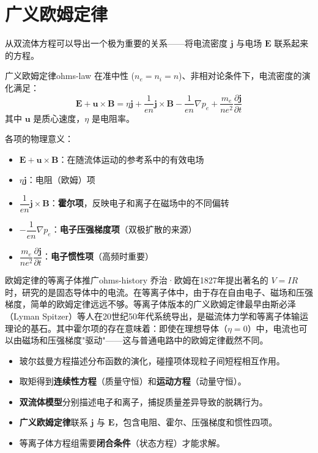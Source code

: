 \documentclass[12pt,a4paper,openany,oneside]{book}
\newcommand{\vect}[1]{\bm{#1}}
\newcommand{\grad}{\nabla}
\newcommand{\difficulty}[1]{\marginnote{\hfill\textcolor{coverMid!80}{\rule[-0.1em]{2pt}{0.9em}}\,\textcolor{coverMid}{\footnotesize\textbf{[#1]}}}}
\begin{document}
\section{广义欧姆定律}\difficulty{提高}

从双流体方程可以导出一个极为重要的关系——将电流密度 $\vect{j}$ 与电场 $\vect{E}$ 联系起来的方程。

\begin{theorem}{广义欧姆定律}{ohms-law}
在准中性 ($n_e = n_i = n$)、非相对论条件下，电流密度的演化满足：
\[
\vect{E} + \vect{u}\times\vect{B} = \eta\vect{j} + \frac{1}{en}\vect{j}\times\vect{B} - \frac{1}{en}\grad p_e + \frac{m_e}{n e^2}\frac{\partial\vect{j}}{\partial t}
\]
其中 $\vect{u}$ 是质心速度，$\eta$ 是电阻率。

各项的物理意义：
\begin{itemize}
\item $\vect{E} + \vect{u}\times\vect{B}$：在随流体运动的参考系中的有效电场
\item $\eta\vect{j}$：电阻（欧姆）项
\item $\dfrac{1}{en}\vect{j}\times\vect{B}$：\textbf{霍尔项}，反映电子和离子在磁场中的不同偏转
\item $-\dfrac{1}{en}\grad p_e$：\textbf{电子压强梯度项}（双极扩散的来源）
\item $\dfrac{m_e}{ne^2}\dfrac{\partial\vect{j}}{\partial t}$：\textbf{电子惯性项}（高频时重要）
\end{itemize}
\end{theorem}

\begin{history}{欧姆定律的等离子体推广}{ohms-history}
乔治·欧姆在1827年提出著名的 $V=IR$ 时，研究的是固态导体中的电流。在等离子体中，由于存在自由电子、磁场和压强梯度，简单的欧姆定律远远不够。等离子体版本的广义欧姆定律最早由斯必泽（Lyman Spitzer）等人在20世纪50年代系统导出，是磁流体力学和等离子体输运理论的基石。其中霍尔项的存在意味着：即使在理想导体（$\eta=0$）中，电流也可以由磁场和压强梯度"驱动"——这与普通电路中的欧姆定律截然不同。
\end{history}

\begin{chapterreview}
\begin{itemize}
\item 玻尔兹曼方程描述分布函数的演化，碰撞项体现粒子间短程相互作用。
\item 取矩得到\textbf{连续性方程}（质量守恒）和\textbf{运动方程}（动量守恒）。
\item \textbf{双流体模型}分别描述电子和离子，捕捉质量差异导致的脱耦行为。
\item \textbf{广义欧姆定律}联系 $\vect{j}$ 与 $\vect{E}$，包含电阻、霍尔、压强梯度和惯性四项。
\item 等离子体方程组需要\textbf{闭合条件}（状态方程）才能求解。
\end{itemize}
\end{chapterreview}
\end{document}
